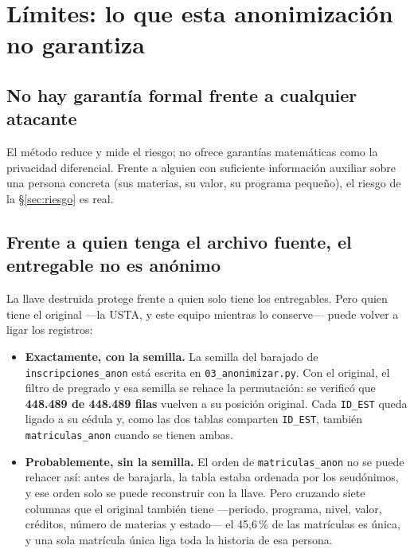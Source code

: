 \documentclass[11pt,a4paper,twoside,twocolumn]{article}
\newcommand{\cod}[1]{\nolinkurl{#1}}
\begin{document}
\section{Límites: lo que esta anonimización no garantiza}\label{sec:limites}

\subsection{No hay garantía formal frente a cualquier atacante}

El método reduce y mide el riesgo; no ofrece garantías matemáticas como la privacidad
diferencial. Frente a alguien con suficiente información auxiliar sobre una persona concreta (sus
materias, su valor, su programa pequeño), el riesgo de la §\ref{sec:riesgo} es real.

\subsection{Frente a quien tenga el archivo fuente, el entregable no es anónimo}\label{sec:fuente}

La llave destruida protege frente a quien solo tiene los entregables. Pero quien tiene el
original ---la USTA, y este equipo mientras lo conserve--- puede volver a ligar los registros:

\begin{itemize}[leftmargin=*,itemsep=2pt,topsep=0pt]
  \item \textbf{Exactamente, con la semilla.} La semilla del barajado de \cod{inscripciones_anon}
  está escrita en \cod{03_anonimizar.py}. Con el original, el filtro de pregrado y esa semilla se
  rehace la permutación: se verificó que \textbf{448.489 de 448.489 filas} vuelven a su posición
  original. Cada \cod{ID_EST} queda ligado a su cédula y, como las dos tablas comparten
  \cod{ID_EST}, también \cod{matriculas_anon} cuando se tienen ambas.
  \item \textbf{Probablemente, sin la semilla.} El orden de \cod{matriculas_anon} no se puede
  rehacer así: antes de barajarla, la tabla estaba ordenada por los seudónimos, y ese orden solo
  se puede reconstruir con la llave. Pero cruzando siete columnas que el original también tiene
  ---periodo, programa, nivel, valor, créditos, número de materias y estado--- el 45,6\,\% de las
  matrículas es única, y una sola matrícula única liga toda la historia de esa persona.
\end{itemize}
\end{document}
